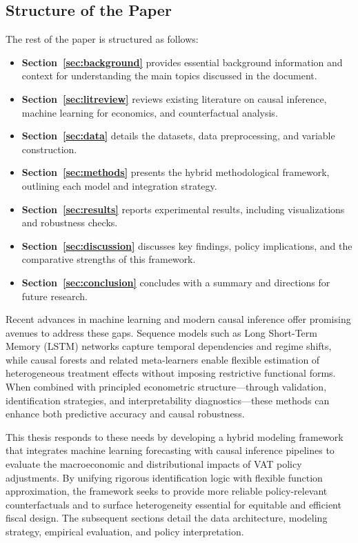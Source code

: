 \subsection{Structure of the Paper}\label{subsec:structure}

The rest of the paper is structured as follows:

\begin{itemize}
    \item \textbf{Section~\ref{sec:background}} provides essential background information and context for understanding the main topics discussed in the document.
    \item \textbf{Section~\ref{sec:litreview}} reviews existing literature on causal inference, machine learning for economics, and counterfactual analysis.
    
    \item \textbf{Section~\ref{sec:data}} details the datasets, data preprocessing, and variable construction.
    
    \item \textbf{Section~\ref{sec:methods}} presents the hybrid methodological framework, outlining each model and integration strategy.
    
    \item \textbf{Section~\ref{sec:results}} reports experimental results, including visualizations and robustness checks.
    
    \item \textbf{Section~\ref{sec:discussion}} discusses key findings, policy implications, and the comparative strengths of this framework.
    
    \item \textbf{Section~\ref{sec:conclusion}} concludes with a summary and directions for future research.
\end{itemize}

Recent advances in machine learning and modern causal inference offer promising avenues to address these gaps. Sequence models such as Long Short-Term Memory (LSTM) networks capture temporal dependencies and regime shifts, while causal forests and related meta-learners enable flexible estimation of heterogeneous treatment effects without imposing restrictive functional forms. When combined with principled econometric structure—through validation, identification strategies, and interpretability diagnostics—these methods can enhance both predictive accuracy and causal robustness.

This thesis responds to these needs by developing a hybrid modeling framework that integrates machine learning forecasting with causal inference pipelines to evaluate the macroeconomic and distributional impacts of VAT policy adjustments. By unifying rigorous identification logic with flexible function approximation, the framework seeks to provide more reliable policy-relevant counterfactuals and to surface heterogeneity essential for equitable and efficient fiscal design. The subsequent sections detail the data architecture, modeling strategy, empirical evaluation, and policy interpretation.


